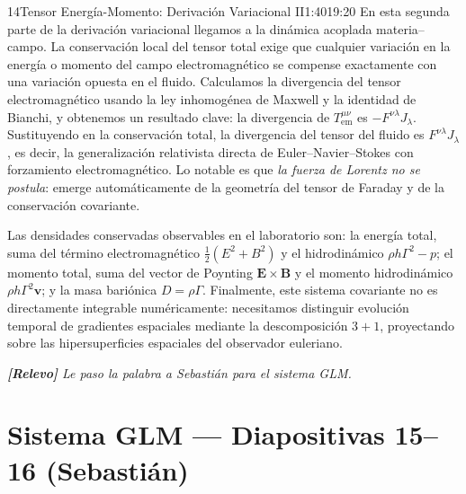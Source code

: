 \documentclass[11pt,a4paper]{article}
\newcommand{\relevo}[1]{%
  \par\medskip
  \noindent\colorbox{tagbg}{\parbox{\dimexpr\linewidth-2\fboxsep\relax}{%
    \small\itshape \textbf{[Relevo]} #1}}\par\medskip}
\begin{document}
\begin{bryorador}{14}{Tensor Energía-Momento: Derivación Variacional II}{1:40}{19:20}
En esta segunda parte de la derivación variacional llegamos a la dinámica
acoplada materia--campo. La conservación local del tensor total exige que
cualquier variación en la energía o momento del campo electromagnético se
compense exactamente con una variación opuesta en el fluido. Calculamos la
divergencia del tensor electromagnético usando la ley inhomogénea de Maxwell
y la identidad de Bianchi, y obtenemos un resultado clave: la divergencia de
$T^{\mu\nu}_\text{em}$ es $-F^{\nu\lambda}J_\lambda$. Sustituyendo en la
conservación total, la divergencia del tensor del fluido es
$F^{\nu\lambda}J_\lambda$, es decir, la generalización relativista directa
de Euler--Navier--Stokes con forzamiento electromagnético. Lo notable es que
\emph{la fuerza de Lorentz no se postula}: emerge automáticamente de la
geometría del tensor de Faraday y de la conservación covariante.

Las densidades conservadas observables en el laboratorio son: la energía
total, suma del término electromagnético $\tfrac{1}{2}(E^2+B^2)$ y el
hidrodinámico $\rho h\Gamma^2-p$; el momento total, suma del vector de
Poynting $\mathbf{E}\times\mathbf{B}$ y el momento hidrodinámico
$\rho h\Gamma^2 \mathbf{v}$; y la masa bariónica $D=\rho\Gamma$. Finalmente,
este sistema covariante no es directamente integrable numéricamente:
necesitamos distinguir evolución temporal de gradientes espaciales mediante
la descomposición $3+1$, proyectando sobre las hipersuperficies espaciales
del observador euleriano.
\relevo{Le paso la palabra a Sebastián para el sistema GLM.}
\end{bryorador}

\section{Sistema GLM --- Diapositivas 15--16 (Sebastián)}
\end{document}

